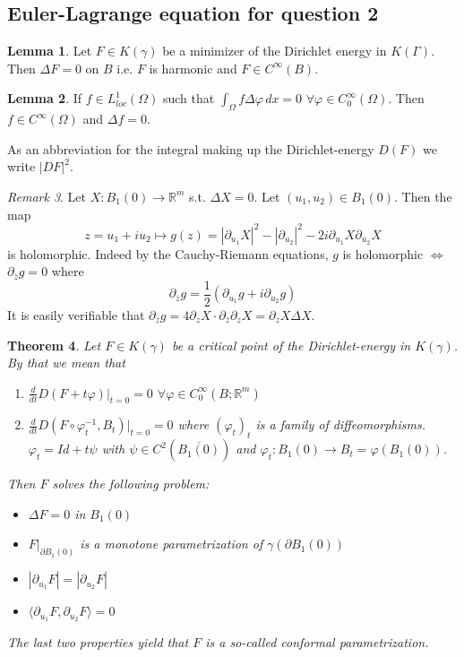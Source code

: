 \documentclass[a4paper, 12pt]{article}
\theoremstyle{plain}
\newtheorem{theorem}{Theorem}[section] %
\theoremstyle{definition}
\theoremstyle{lemma}
\newtheorem{lemma}[theorem]{Lemma}
\theoremstyle{remark}
\newtheorem{remark}[theorem]{Remark}
\theoremstyle{corollary}
\theoremstyle{example}
\begin{document}
	\subsection{Euler-Lagrange equation for question 2}
	\begin{lemma}
		Let $F \in K(\gamma)$ be a minimizer of the Dirichlet energy in $K(\Gamma)$. Then $\Delta F = 0$ on $B$ i.e. $F$ is harmonic and $F \in C^\infty(B)$.
	\end{lemma}
	\begin{lemma}
		If $f \in L^1_{loc}(\Omega)$ such that $\int_\Omega f \Delta \varphi \, dx = 0$ $\forall \varphi \in C_0^\infty(\Omega)$. Then $f \in C^\infty(\Omega)$ and $\Delta f = 0$.
	\end{lemma}
	As an abbreviation for the integral making up the Dirichlet-energy $D(F)$ we write $\left|DF\right|^2$.
	\begin{remark}
		Let $X: B_1(0) \to \mathbb{R}^m$ s.t. $\Delta X = 0$. Let $(u_1,u_2) \in B_1(0)$. Then the map \[z = u_1 + iu_2 \mapsto g(z) = \left|\partial_{u_1} X\right|^2 - \left|\partial_{u_2}\right|^2 - 2i \partial_{u_1} X \partial_{u_2}X\] is holomorphic. Indeed by the Cauchy-Riemann equations, $g$ is holomorphic $\iff$ $\partial_{\overline{z}} g = 0$ where \[\partial_{\overline{z}} g = \frac{1}{2}\left(\partial_{u_1}g + i \partial_{u_2}g\right)\]  
		It is easily verifiable that $\partial_{\overline{z}} g = 4 \partial_z X \cdot \partial_{\overline{z}} \partial_z X = \partial_z X \Delta X$.
	\end{remark}
	\begin{theorem}
		Let $F \in K(\gamma)$ be a critical point of the Dirichlet-energy in $K(\gamma)$. By that we mean that \begin{enumerate}
			\item $\frac{d}{dt} D(F+t\varphi)|_{t=0} = 0$ $\forall \varphi \in C_0^\infty(B;\mathbb{R}^m)$
			\item $\frac{d}{dt} D(F\circ \varphi^{-1}_t, B_t)|_{t=0} = 0$ where $(\varphi_t)_t$ is a family of diffeomorphisms. $\varphi_t = Id + t\psi$ with $\psi \in C^2(\overline{B_1(0)})$ and $\varphi_t: B_1(0) \to B_t = \varphi(B_1(0))$.
		\end{enumerate}
		Then $F$ solves the following problem:
		\begin{itemize}
			\item $\Delta F = 0$ in $B_1(0)$
			\item $F|_{\partial B_1(0)}$ is a monotone parametrization of $\gamma(\partial B_1(0))$
			\item $\left|\partial_{u_1} F\right| = \left|\partial_{u_2} F\right|$
			\item $\langle \partial_{u_1} F, \partial_{u_2} F \rangle = 0$
		\end{itemize}
		The last two properties yield that $F$ is a so-called conformal parametrization.
	\end{theorem}
\end{document}
